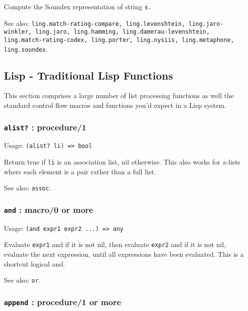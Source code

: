\documentclass[
]{article}
\newcommand{\passthrough}[1]{#1}
\begin{document}
Compute the Soundex representation of string
\passthrough{\lstinline!s.!}

See also:
\passthrough{\lstinline!ling.match-rating-compare, ling.levenshtein, ling.jaro-winkler, ling.jaro, ling.hamming, ling.damerau-levenshtein, ling.match-rating-codex, ling.porter, ling.nysiis, ling.metaphone, ling.soundex!}.

\hypertarget{lisp---traditional-lisp-functions}{%
\subsection{Lisp - Traditional Lisp
Functions}\label{lisp---traditional-lisp-functions}}

This section comprises a large number of list processing functions as
well the standard control flow macros and functions you'd expect in a
Lisp system.

\hypertarget{alist-procedure1}{%
\subsubsection{\texorpdfstring{\texttt{alist?} :
procedure/1}{alist? : procedure/1}}\label{alist-procedure1}}

Usage: \passthrough{\lstinline!(alist? li) => bool!}

Return true if \passthrough{\lstinline!li!} is an association list, nil
otherwise. This also works for a-lists where each element is a pair
rather than a full list.

See also: \passthrough{\lstinline!assoc!}.

\hypertarget{and-macro0-or-more}{%
\subsubsection{\texorpdfstring{\texttt{and} : macro/0 or
more}{and : macro/0 or more}}\label{and-macro0-or-more}}

Usage: \passthrough{\lstinline!(and expr1 expr2 ...) => any!}

Evaluate \passthrough{\lstinline!expr1!} and if it is not nil, then
evaluate \passthrough{\lstinline!expr2!} and if it is not nil, evaluate
the next expression, until all expressions have been evaluated. This is
a shortcut logical and.

See also: \passthrough{\lstinline!or!}.

\hypertarget{append-procedure1-or-more}{%
\subsubsection{\texorpdfstring{\texttt{append} : procedure/1 or
more}{append : procedure/1 or more}}\label{append-procedure1-or-more}}
\end{document}
